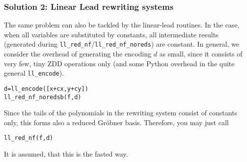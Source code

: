 \documentclass[]{article}
\begin{document}
\subsubsection{Solution 2: Linear Lead rewriting systems}
The same problem can also be tackled by the linear-lead routines. In the case, when
all variables are substituted by  constants, all intermediate results
(generated during \verb|ll_red_nf|/\verb|ll_red_nf_noreds|) are constant.
In general, we consider the overhead of generating the encoding $d$ as small, 
since it consists of very few, tiny ZDD operations only (and some Python overhead in the quite general \verb|ll_encode|).
\begin{verbatim}
d=ll_encode([x+cx,y+cy])
ll_red_nf_noredsb(f,d)
\end{verbatim}
%
%
Since the tails of the polynomials in the rewriting system   consist of
constants only, this forms also a
reduced Gröbner basis. Therefore, you may just call
\begin{verbatim}
ll_red_nf(f,d)   
\end{verbatim}
%
%
It is assumed, that this is the fasted way.


%
\end{document}
